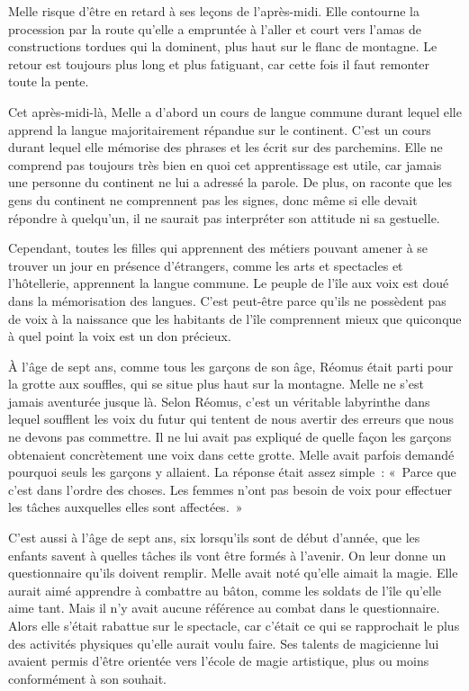 Melle risque d'être en retard à ses leçons de l'après-midi. Elle contourne la procession par la route qu'elle a empruntée à l'aller et court vers l'amas de constructions tordues qui la dominent, plus haut sur le flanc de montagne. Le retour est toujours plus long et plus fatiguant, car cette fois il faut remonter toute la pente.

\parbr

Cet après-midi-là, Melle a d'abord un cours de langue commune durant lequel elle apprend la langue majoritairement répandue sur le continent. C'est un cours durant lequel elle mémorise des phrases et les écrit sur des parchemins. Elle ne comprend pas toujours très bien en quoi cet apprentissage est utile, car jamais une personne du continent ne lui a adressé la parole. De plus, on raconte que les gens du continent ne comprennent pas les signes, donc même si elle devait répondre à quelqu'un, il ne saurait pas interpréter son attitude ni sa gestuelle.

Cependant, toutes les filles qui apprennent des métiers pouvant amener à se trouver un jour en présence d'étrangers, comme les arts et spectacles et l'hôtellerie, apprennent la langue commune. Le peuple de l'île aux voix est doué dans la mémorisation des langues. C'est peut-être parce qu'ils ne possèdent pas de voix à la naissance que les habitants de l'île comprennent mieux que quiconque à quel point la voix est un don précieux.

À l'âge de sept ans, comme tous les garçons de son âge, Réomus était parti pour la grotte aux souffles, qui se situe plus haut sur la montagne. Melle ne s'est jamais aventurée jusque là. Selon Réomus, c'est un véritable labyrinthe dans lequel soufflent les voix du futur qui tentent de nous avertir des erreurs que nous ne devons pas commettre. Il ne lui avait pas expliqué de quelle façon les garçons obtenaient concrètement une voix dans cette grotte. Melle avait parfois demandé pourquoi seuls les garçons y allaient. La réponse était assez simple~: «~Parce que c'est dans l'ordre des choses. Les femmes n'ont pas besoin de voix pour effectuer les tâches auxquelles elles sont affectées.~»

C'est aussi à l'âge de sept ans, six lorsqu'ils sont de début d'année, que les enfants savent à quelles tâches ils vont être formés à l'avenir. On leur donne un questionnaire qu'ils doivent remplir. Melle avait noté qu'elle aimait la magie. Elle aurait aimé apprendre à combattre au bâton, comme les soldats de l'île qu'elle aime tant. Mais il n'y avait aucune référence au combat dans le questionnaire. Alors elle s'était rabattue sur le spectacle, car c'était ce qui se rapprochait le plus des activités physiques qu'elle aurait voulu faire. Ses talents de magicienne lui avaient permis d'être orientée vers l'école de magie artistique, plus ou moins conformément à son souhait.

